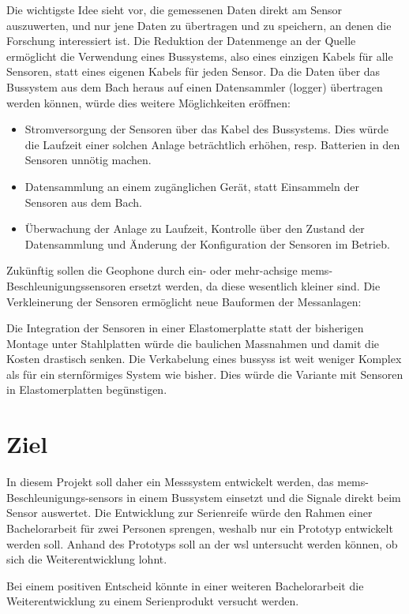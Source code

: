 Die wichtigste Idee sieht vor, die gemessenen Daten direkt am Sensor auszuwerten, und nur jene Daten zu übertragen und zu speichern, an denen die Forschung interessiert ist. Die Reduktion der Datenmenge an der Quelle ermöglicht die Verwendung eines Bussystems, also eines einzigen Kabels für alle Sensoren, statt eines eigenen Kabels für jeden Sensor. Da die Daten über das Bussystem aus dem Bach heraus auf einen Datensammler (\gls{logger}) übertragen werden können, würde dies weitere Möglichkeiten eröffnen:
\begin{itemize}
\item Stromversorgung der Sensoren über das Kabel des Bussystems. Dies würde die Laufzeit einer solchen Anlage beträchtlich erhöhen, resp. Batterien in den Sensoren unnötig machen.
\item Datensammlung an einem zugänglichen Gerät, statt Einsammeln der Sensoren aus dem Bach.
\item Überwachung der Anlage zu Laufzeit, Kontrolle über den Zustand der Datensammlung und Änderung der Konfiguration der Sensoren im Betrieb.
\end{itemize}

Zukünftig sollen die Geophone durch ein- oder mehr-achsige \gls{mems}-Beschleunigungssensoren ersetzt werden, da diese wesentlich kleiner sind. Die Verkleinerung der Sensoren ermöglicht neue Bauformen der Messanlagen:

Die Integration der Sensoren in einer Elastomerplatte statt der bisherigen Montage unter Stahlplatten würde die baulichen Massnahmen und damit die Kosten drastisch senken. Die Verkabelung eines \gls{bussys}s ist weit weniger Komplex als für ein sternförmiges System wie bisher. Dies würde die Variante mit Sensoren in Elastomerplatten begünstigen.

\section{Ziel}
In diesem Projekt soll daher ein Messsystem entwickelt werden, das \gls{mems}-Beschleunigungs-\glspl{sensor} in einem Bussystem einsetzt und die Signale direkt beim Sensor auswertet. Die Entwicklung zur Serienreife würde den Rahmen einer Bachelorarbeit für zwei Personen sprengen, weshalb nur ein Prototyp entwickelt werden soll. Anhand des Prototyps soll an der \gls{wsl} untersucht werden können, ob sich die Weiterentwicklung lohnt. 

Bei einem positiven Entscheid könnte in einer weiteren Bachelorarbeit die Weiterentwicklung zu einem Serienprodukt versucht werden.

